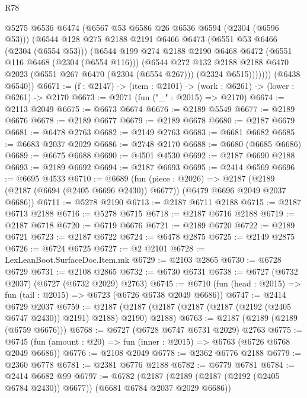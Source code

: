 \begin{lexlean}{R78}
\begin{coremodule}
            @5275
            @6536
            @6474
            (@6567 @53 @6586 @26 @6536 @6594 (@2304 (@6596 @53)))
            (@6544
              @128
              @275
              @2188
              @2191
              @6466
              @6473
              (@6551 @53 @6466 (@2304 (@6554 @53)))
              (@6544
                @199
                @274
                @2188
                @2190
                @6468
                @6472
                (@6551 @116 @6468 (@2304 (@6554 @116)))
                (@6544
                  @272
                  @132
                  @2188
                  @2188
                  @6470
                  @2023
                  (@6551 @267 @6470 (@2304 (@6554 @267)))
                  (@2324 @6515)))))))
      (@6438 @6540))
@6671 := (f : @2147) -> (item : @2101) -> (work : @6261) -> (lower : @6261) -> @2170
@6673 := @2071 (fun ("_" : @2015) => @2170)
@6674 := @2113 @2049
@6675 := @6673 @6674
@6676 := @2189 @5549
@6677 := @2189 @6676
@6678 := @2189 @6677
@6679 := @2189 @6678
@6680 := @2187 @6679
@6681 := @6478 @2763
@6682 := @2149 @2763
@6683 := @6681 @6682
@6685 := @6683 @2037 @2029
@6686 := @2748 @2170
@6688 := @6680 (@6685 @6686)
@6689 := @6675 @6688
@6690 := @4501 @4530
@6692 := @2187 @6690 @2188
@6693 := @2189 @6692
@6694 := @2187 @6693
@6695 := @2414 @6569
@6696 := @6695 @4533
@6710 := @6689
    (fun (piece : @2026) =>
    @2187 (@2189 (@2187 (@6694 (@2405 @6696 @2430)) @6677)) (@6479 @6696 @2049 @2037 @6686))
@6711 := @5278 @2190
@6713 := @2187 @6711 @2188
@6715 := @2187 @6713 @2188
@6716 := @5278 @6715
@6718 := @2187 @6716 @2188
@6719 := @2187 @6718
@6720 := @6719 @6676
@6721 := @2189 @6720
@6722 := @2189 @6721
@6723 := @2187 @6722
@6724 := @6478 @2875
@6725 := @2149 @2875
@6726 := @6724 @6725
@6727 := @2 @2101
@6728 := LexLeanBoot.SurfaceDoc.Item.mk
@6729 := @2103 @2865
@6730 := @6728 @6729
@6731 := @2108 @2865
@6732 := @6730 @6731
@6738 := @6727 (@6732 @2037) (@6727 (@6732 @2029) @2763)
@6745 := @6710 (fun (head : @2015) => fun (tail : @2015) => @6723 (@6726 @6738 @2049 @6686))
@6747 := @2414 @6729 @2037
@6759 := @2187 (@2187 (@2187 (@2187 (@2187 (@2192 (@2405 @6747 @2430)) @2191) @2188) @2190) @2188)
@6763 := @2187 (@2189 (@2189 (@6759 @6676)))
@6768 := @6727 (@6728 @6747 @6731 @2029) @2763
@6775 := @6745 (fun (amount : @20) => fun (inner : @2015) => @6763 (@6726 @6768 @2049 @6686))
@6776 := @2108 @2049
@6778 := @2362 @6776 @2188
@6779 := @2360 @6778
@6781 := @2381 @6776 @2188
@6782 := @6779 @6781
@6784 := @2414 @6682 @99
@6797 := @6782
    (@2187 (@2189 (@2187 (@2192 (@2405 @6784 @2430)) @6677)) (@6681 @6784 @2037 @2029 @6686))

\end{coremodule}
\end{lexlean}

